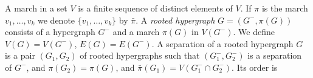 A march in a set $V$ is a finite sequence of distinct elements of $V$. If $\pi$ is the march $v_1, \dots, v_k$ we denote $\{v_1, \dots, v_k\}$ by $\bar{\pi}$. A \textit{rooted hypergraph} $G = (G^-, \pi(G))$ consists of a hypergraph $G^-$ and a march $\pi(G)$ in $V(G^-)$. We define $V(G) = V(G^-)$, $E(G) = E(G^-)$. A separation of a rooted hypergraph $G$ is a pair $(G_1, G_2)$ of rooted hypergraphs such that $(G_1^-, G_2^-)$ is a separation of $G^-$, and $\pi(G_2) = \pi(G)$, and $\bar{\pi}(G_1) = V(G_1^- \cap G_2^-)$. Its order is
